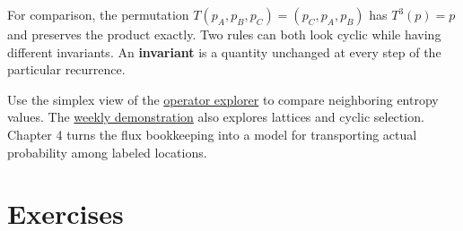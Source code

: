\documentclass[11pt,oneside,openany]{book}
\theoremstyle{definition}
\theoremstyle{remark}
\numberwithin{equation}{chapter}
\begin{document}
For comparison, the permutation \(T(p_A,p_B,p_C)=(p_C,p_A,p_B)\) has \(T^3(p)=p\) and preserves the product exactly. Two rules can both look cyclic while having different invariants. An \textbf{invariant} is a quantity unchanged at every step of the particular recurrence.

Use the simplex view of the \href{https://bobovski66.github.io/IntroDiscreteInfoGeom/demos/operator-explorer.html}{operator explorer} to compare neighboring entropy values. The \href{https://bobovski66.github.io/IntroDiscreteInfoGeom/demos/week03.html}{weekly demonstration} also explores lattices and cyclic selection. Chapter 4 turns the flux bookkeeping into a model for transporting actual probability among labeled locations.

\section{Exercises}\label{ch03-exercises}
\end{document}
